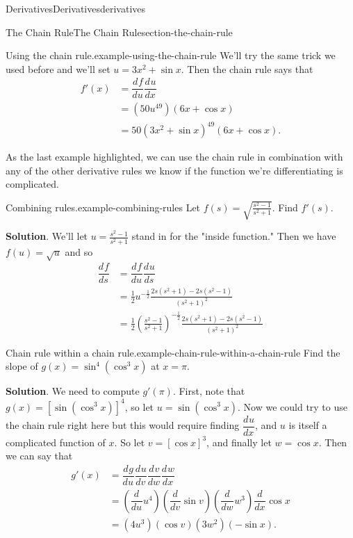 \documentclass[oneside,10pt,]{book}
\numberwithin{equation}{section}
\newcommand{\dv}[3][]{\dfrac{d^{#1} #2}{d #3^{#1}}}
\begin{document}
\begin{chapterptx}{Derivatives}{}{Derivatives}{}{}{derivatives}
\begin{sectionptx}{The Chain Rule}{}{The Chain Rule}{}{}{section-the-chain-rule}
\begin{example}{Using the chain rule.}{example-using-the-chain-rule}
We'll try the same trick we used before and we'll set \(u = 3x^{2} + \sin x\). Then the chain rule says that%
\begin{align*}
f'(x) & =\dv{f}{u}\dv{u}{x} \\
& = (50u^{49})(6x+\cos x) \\
& = 50(3x^{2} + \sin x)^{49}(6x + \cos x). 
\end{align*}
%
\end{example}
\hypertarget{p-153}{}%
As the last example highlighted, we can use the chain rule in combination with any of the other derivative rules we know if the function we're differentiating is complicated.%
\begin{example}{Combining rules.}{example-combining-rules}%
\hypertarget{p-154}{}%
Let \(f(s) = \sqrt{\frac{s^{2} - 1}{s^{2} + 1}}\). Find \(f'(s)\).%
\par\smallskip%
\noindent\textbf{Solution}.\hypertarget{solution-31}{}\quad%
\hypertarget{p-155}{}%
We'll let \(u = \frac{s^{2}-1}{s^{2}+1}\) stand in for the "inside function." Then we have \(f(u) = \sqrt{u}\) and so%
\begin{align*}
\dv{f}{s} & = \dv{f}{u}\dv{u}{s} \\
& = \frac{1}{2}u^{-\frac{1}{2}}\frac{2s(s^{2}+1) - 2s(s^{2}-1)}{(s^{2}+1)^{2}} \\
& = \frac{1}{2}\left(\frac{s^{2}-1}{s^{2}+1}\right)^{-\frac{1}{2}}\frac{2s(s^{2}+1) - 2s(s^{2}-1)}{(s^{2}+1)^{2}} 
\end{align*}
%
\end{example}
\begin{example}{Chain rule within a chain rule.}{example-chain-rule-within-a-chain-rule}%
\hypertarget{p-156}{}%
Find the slope of \(g(x) = \sin^{4}(\cos^{3}x)\) at \(x=\pi\).%
\par\smallskip%
\noindent\textbf{Solution}.\hypertarget{solution-32}{}\quad%
\hypertarget{p-157}{}%
We need to compute \(g'(\pi)\). First, note that \(g(x) = [\sin(\cos^{3}x)]^{4}\), so let \(u = \sin(\cos^{3}x)\). Now we could try to use the chain rule right here but this would require finding \(\dv{u}{x}\), and \(u\) is itself a complicated function of \(x\). So let \(v = [\cos x]^{3}\), and finally let \(w = \cos x\). Then we can say that%
\begin{align*}
g'(x) & = \dv{g}{u}\dv{u}{v}\dv{v}{w}\dv{w}{x} \\
& = \left(\dv{}{u}u^{4}\right)\left(\dv{}{v}\sin v\right)\left(\dv{}{w}w^{3}\right)\dv{}{x}\cos x \\
& = (4u^{3})(\cos v)(3w^{2})(-\sin x). 

\end{align*}
\end{example}
\end{sectionptx}
\end{chapterptx}
\end{document}
